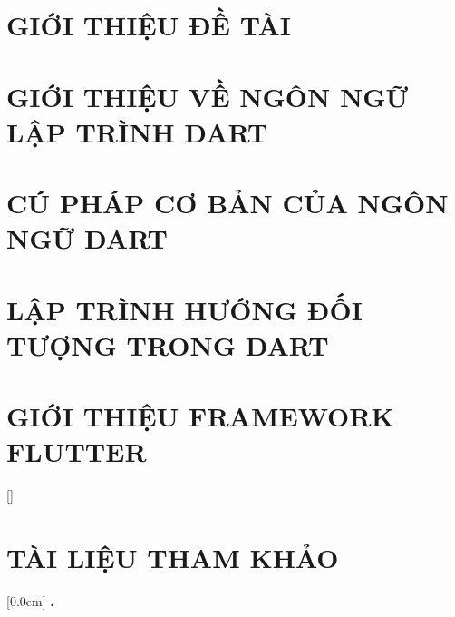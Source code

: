 \documentclass[a4paper,13pt,3p,oneside]{report}
\renewcommand{\headrulewidth}{0pt}
\renewcommand{\footrulewidth}{0pt}}
\theoremstyle{definition}
\begin{document}
\pagestyle{fancy}
\fancyhf{}
\fancyhead[LO, RE]{\leftmark}
\renewcommand{\headrulewidth}{0.3pt}
\renewcommand{\footrulewidth}{0.3pt}
\doublespacing

\chapter{GIỚI THIỆU ĐỀ TÀI}
\label{chapter:Introduction}

\newpage
\chapter{GIỚI THIỆU VỀ NGÔN NGỮ LẬP TRÌNH DART}
\label{chapter:Introduction_Dart_Programming}


\newpage
\chapter{CÚ PHÁP CƠ BẢN CỦA NGÔN NGỮ DART}
\label{chapter:Dart_Syntax}


\newpage
\chapter{LẬP TRÌNH HƯỚNG ĐỐI TƯỢNG TRONG DART}
\label{chapter:Experiment}


\newpage
\chapter{GIỚI THIỆU FRAMEWORK FLUTTER}
\label{chapter:SolutionAndContribution}


\cleardoublepage              %
\null                        
\thispagestyle{empty}        
\newpage                    


[]

\chapter*{TÀI LIỆU THAM KHẢO}
{}


\titlespacing*{\chapter}{0pt}{-20pt}{20pt}

    [0.0cm]             %
    {\bfseries\vspace{0.3cm}}                  %
    {{\bfseries{\scshape} \thecontentslabel.\ }} %
    {}         %
    {\contentspage}         %
\end{document}
